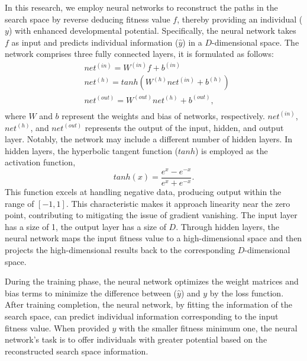 \documentclass[journal,twoside]{IEEEtran}
\begin{document}
In this research, we employ neural networks to reconstruct the paths in the search space by reverse deducing fitness value $f$, thereby providing an individual ($y$) with enhanced developmental potential. Specifically, the neural network takes $f$ as input and predicts individual information ($\hat{y}$) in a $D$-dimensional space. The network comprises three fully connected layers, it is formulated as follows:
\begin{equation}
	\begin{split}
		&net^{(in)} = W^{(in)} f + b^{(in)} \\
		&net^{(h)} = tanh(W^{(h)} net^{(in)} + b^{(h)})\\
		&net^{(out)} = W^{(out)} net^{(h)} + b^{(out)}, \\
	\end{split}
\end{equation}
where $W$ and $b$ represent the weights and bias of networks, respectively. $net^{(in)}$, $net^{(h)}$, and $ net^{(out)}$ represents the output of the input, hidden, and output layer. Notably, the network may include a different number of hidden layers. In hidden layers, the hyperbolic tangent function ($tanh$) is employed as the activation function,
\begin{equation}
	tanh(x) = \frac{e^{x}- e^{-x}}{e^{x} + e^{-x}}.
\end{equation}
This function excels at handling negative data, producing output within the range of $[-1, 1]$. This characteristic makes it approach linearity near the zero point, contributing to mitigating the issue of gradient vanishing. The input layer has a size of 1, the output layer has a size of $D$. Through hidden layers, the neural network maps the input fitness value to a high-dimensional space and then projects the high-dimensional results back to the corresponding $D$-dimensional space.

During the training phase, the neural network optimizes the weight matrices and bias terms to minimize the difference between ($\hat{y}$) and $y$ by the loss function. After training completion, the neural network, by fitting the information of the search space, can predict individual information corresponding to the input fitness value. When provided $y$ with the smaller fitness minimum one, the neural network's task is to offer individuals with greater potential based on the reconstructed search space information.
\end{document}
